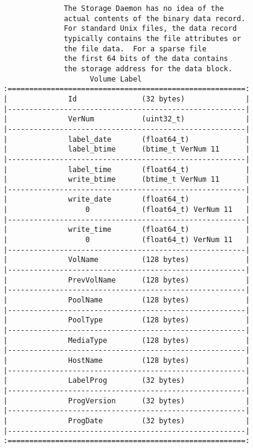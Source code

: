 \begin{verbatim}
                 The Storage Daemon has no idea of the
                 actual contents of the binary data record.
                 For standard Unix files, the data record
                 typically contains the file attributes or
                 the file data.  For a sparse file
                 the first 64 bits of the data contains
                 the storage address for the data block.
                       Volume Label
   :=======================================================:
   |              Id               (32 bytes)              |
   |-------------------------------------------------------|
   |              VerNum           (uint32_t)              |
   |-------------------------------------------------------|
   |              label_date       (float64_t)             |
   |              label_btime      (btime_t VerNum 11      |
   |-------------------------------------------------------|
   |              label_time       (float64_t)             |
   |              write_btime      (btime_t VerNum 11      |
   |-------------------------------------------------------|
   |              write_date       (float64_t)             |
   |                  0            (float64_t) VerNum 11   |
   |-------------------------------------------------------|
   |              write_time       (float64_t)             |
   |                  0            (float64_t) VerNum 11   |
   |-------------------------------------------------------|
   |              VolName          (128 bytes)             |
   |-------------------------------------------------------|
   |              PrevVolName      (128 bytes)             |
   |-------------------------------------------------------|
   |              PoolName         (128 bytes)             |
   |-------------------------------------------------------|
   |              PoolType         (128 bytes)             |
   |-------------------------------------------------------|
   |              MediaType        (128 bytes)             |
   |-------------------------------------------------------|
   |              HostName         (128 bytes)             |
   |-------------------------------------------------------|
   |              LabelProg        (32 bytes)              |
   |-------------------------------------------------------|
   |              ProgVersion      (32 bytes)              |
   |-------------------------------------------------------|
   |              ProgDate         (32 bytes)              |
   |-------------------------------------------------------|
   :=======================================================:


\end{verbatim}
